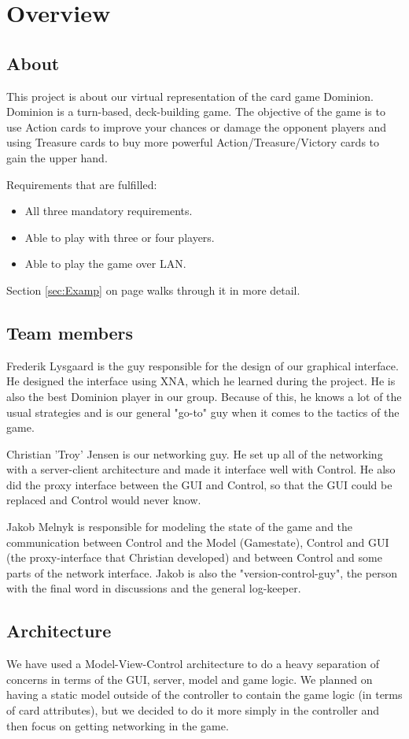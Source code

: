 \documentclass[12pt,a4paper,notitlepage]{article}
\begin{document}
\section{Overview}
\subsection{About}
This project is about our virtual representation of the card game Dominion. Dominion is a turn-based, deck-building game. The objective of the game is to use Action cards to improve your chances or damage the opponent players and using Treasure cards to buy more powerful Action/Treasure/Victory cards to gain the upper hand. 

Requirements that are fulfilled:
\begin{itemize}
\item All three mandatory requirements.
\item Able to play with three or four players.
\item Able to play the game over LAN.
\end{itemize}
Section \ref{sec:Examp} on page \pageref{sec:Examp} walks through it in more detail.

\subsection{Team members}
Frederik Lysgaard is the guy responsible for the design of our graphical interface. He designed the interface using XNA, which he learned during the project. He is also the best Dominion player in our group. Because of this, he knows a lot of the usual strategies and is our general "go-to" guy when it comes to the tactics of the game.

Christian 'Troy' Jensen is our networking guy. He set up all of the networking with a server-client architecture and made it interface well with Control. He also did the proxy interface between the GUI and Control, so that the GUI could be replaced and Control would never know. 

Jakob Melnyk is responsible for modeling the state of the game and the communication between Control and the Model (Gamestate), Control and GUI (the proxy-interface that Christian developed) and between Control and some parts of the network interface. Jakob is also the "version-control-guy", the person with the final word in discussions and the general log-keeper.

\subsection{Architecture}
We have used a Model-View-Control architecture to do a heavy separation of concerns in terms of the GUI, server, model and game logic. We planned on having a static model outside of the controller to contain the game logic (in terms of card attributes), but we decided to do it more simply in the controller and then focus on getting networking in the game. 
\end{document}
